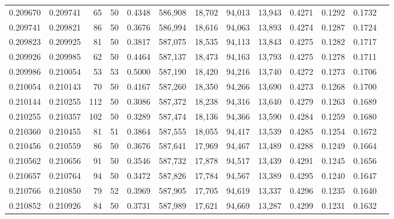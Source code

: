 \begin{tabular}{rrrrrrrrrrrrr}
0.209670 & 0.209741 &    65 &  50 &                                     0.4348 & 586,908 &  18,702 &  94,013 &  13,943 & 0.4271 & 0.1292 & 0.1732 \\
0.209741 & 0.209821 &    86 &  50 &                                     0.3676 & 586,994 &  18,616 &  94,063 &  13,893 & 0.4274 & 0.1287 & 0.1724 \\
0.209823 & 0.209925 &    81 &  50 &                                     0.3817 & 587,075 &  18,535 &  94,113 &  13,843 & 0.4275 & 0.1282 & 0.1717 \\
0.209926 & 0.209985 &    62 &  50 &                                     0.4464 & 587,137 &  18,473 &  94,163 &  13,793 & 0.4275 & 0.1278 & 0.1711 \\
0.209986 & 0.210054 &    53 &  53 &                                     0.5000 & 587,190 &  18,420 &  94,216 &  13,740 & 0.4272 & 0.1273 & 0.1706 \\
0.210054 & 0.210143 &    70 &  50 &                                     0.4167 & 587,260 &  18,350 &  94,266 &  13,690 & 0.4273 & 0.1268 & 0.1700 \\
0.210144 & 0.210255 &   112 &  50 &                                     0.3086 & 587,372 &  18,238 &  94,316 &  13,640 & 0.4279 & 0.1263 & 0.1689 \\
0.210255 & 0.210357 &   102 &  50 &                                     0.3289 & 587,474 &  18,136 &  94,366 &  13,590 & 0.4284 & 0.1259 & 0.1680 \\
0.210360 & 0.210455 &    81 &  51 &                                     0.3864 & 587,555 &  18,055 &  94,417 &  13,539 & 0.4285 & 0.1254 & 0.1672 \\
0.210456 & 0.210559 &    86 &  50 &                                     0.3676 & 587,641 &  17,969 &  94,467 &  13,489 & 0.4288 & 0.1249 & 0.1664 \\
0.210562 & 0.210656 &    91 &  50 &                                     0.3546 & 587,732 &  17,878 &  94,517 &  13,439 & 0.4291 & 0.1245 & 0.1656 \\
0.210657 & 0.210764 &    94 &  50 &                                     0.3472 & 587,826 &  17,784 &  94,567 &  13,389 & 0.4295 & 0.1240 & 0.1647 \\
0.210766 & 0.210850 &    79 &  52 &                                     0.3969 & 587,905 &  17,705 &  94,619 &  13,337 & 0.4296 & 0.1235 & 0.1640 \\
0.210852 & 0.210926 &    84 &  50 &                                     0.3731 & 587,989 &  17,621 &  94,669 &  13,287 & 0.4299 & 0.1231 & 0.1632 \\

\end{tabular}
